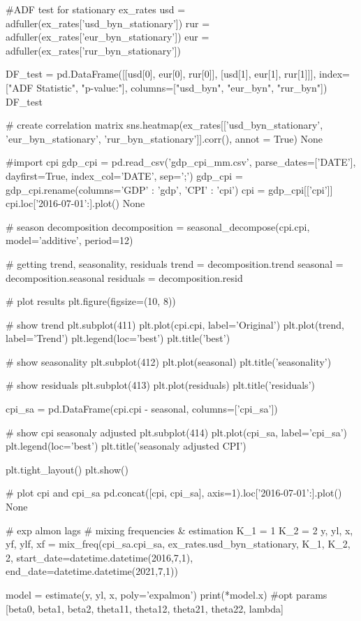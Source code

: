 \documentclass[a4paper, 14pt]{extarticle}
\begin{document}
\begin{python}
	#ADF test for stationary ex_rates
	usd = adfuller(ex_rates['usd_byn_stationary'])
	rur = adfuller(ex_rates['eur_byn_stationary'])
	eur = adfuller(ex_rates['rur_byn_stationary'])
	
	DF_test = pd.DataFrame([[usd[0], eur[0], rur[0]], [usd[1], eur[1], rur[1]]], index=["ADF Statistic", "p-value:"], columns=["usd_byn", "eur_byn", "rur_byn"])
	DF_test
		
	# create correlation matrix
	sns.heatmap(ex_rates[['usd_byn_stationary', 'eur_byn_stationary', 'rur_byn_stationary']].corr(), annot = True)
	None
	
	#import cpi
	gdp_cpi = pd.read_csv('gdp_cpi_mm.csv', parse_dates=['DATE'], dayfirst=True, index_col='DATE', sep=';')
	gdp_cpi = gdp_cpi.rename(columns={'GDP' : 'gdp', 'CPI' : 'cpi'})
	cpi = gdp_cpi[['cpi']]
	cpi.loc['2016-07-01':].plot()
	None
	
	# season decomposition
	decomposition = seasonal_decompose(cpi.cpi, model='additive', period=12)
	
	# getting trend, seasonality, residuals
	trend = decomposition.trend
	seasonal = decomposition.seasonal
	residuals = decomposition.resid
	
	# plot results
	plt.figure(figsize=(10, 8))
	
	# show trend
	plt.subplot(411)
	plt.plot(cpi.cpi, label='Original')
	plt.plot(trend, label='Trend')
	plt.legend(loc='best')
	plt.title('best')
	
	# show seasonality
	plt.subplot(412)
	plt.plot(seasonal)
	plt.title('seasonality')
	
	# show residuals
	plt.subplot(413)
	plt.plot(residuals)
	plt.title('residuals')
	
	cpi_sa = pd.DataFrame(cpi.cpi - seasonal, columns=['cpi_sa'])
	
	# show cpi seasonaly adjusted
	plt.subplot(414)
	plt.plot(cpi_sa, label='cpi_sa')
	plt.legend(loc='best')
	plt.title('seasonaly adjusted CPI')
	
	plt.tight_layout()
	plt.show()
	
	# plot cpi and cpi_sa
	pd.concat([cpi, cpi_sa], axis=1).loc['2016-07-01':].plot()
	None
		
		# exp almon lags
		# mixing frequencies & estimation
		K_1 = 1
		K_2 = 2
		y, yl, x, yf, ylf, xf = mix_freq(cpi_sa.cpi_sa, ex_rates.usd_byn_stationary, K_1, K_2, 2,
		start_date=datetime.datetime(2016,7,1),
		end_date=datetime.datetime(2021,7,1))
		
		model = estimate(y, yl, x, poly='expalmon')
		print(*model.x)
		#opt params [beta0, beta1, beta2, theta11, theta12, theta21, theta22, lambda]
		

\end{python}
\end{document}
